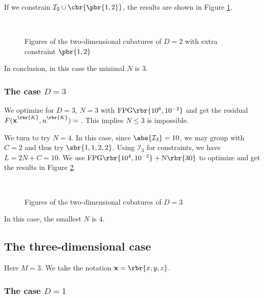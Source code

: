 \documentclass[english, nochinese]{pnote}
\begin{document}
If we constrain $ \mathcal{I}_2 \cup \cbr{ \pbr{ 1, 2 } } $, the results are shown in Figure \ref{Fig:M2D212}.

\begin{figure}[htbp]
\centering
\scalebox{0.75}{}~
\scalebox{0.75}{}
\caption{Figures of the two-dimensional cubatures of $ D = 2 $ with extra constraint $ \pbr{ 1, 2 } $}
\label{Fig:M2D212}
\end{figure}

In conclusion, in this case the minimal $N$ is $3$.

\subsubsection{The case $ D = 3 $}

We optimize for $ D = 3 $, $ N = 3 $ with $ \text{FPG} \rbr{ 10^6, 10^{-2} } $ and get the residual $ F ( \mathbf{x}_{\cdot}^{\rbr{K}}, u_{\cdot}^{\rbr{K}} ) = \text{} $. This implies $ N \le 3 $ is impossible.

We turn to try $ N = 4 $. In this case, since $ \abs{\mathcal{I}_3} = 10 $, we may group with $ C = 2 $ and thus try $ \sbr{ 1, 1, 2, 2 } $. Using $\mathcal{I}_3$ for constraints, we have $ L = 2 N + C = 10 $. We use $ \text{FPG} \rbr{ 10^4, 10^{-2} } + \text{N} \rbr{30} $ to optimize and get the results in Figure \ref{Fig:M2D3}.

\begin{figure}[htbp]
\centering
\scalebox{0.75}{}~
\scalebox{0.75}{}
\caption{Figures of the two-dimensional cubatures of $ D = 3 $}
\label{Fig:M2D3}
\end{figure}

In this case, the smallest $N$ is $4$.

\subsection{The three-dimensional case}

Here $ M = 3 $. We take the notation $ \mathbf{x} = \rbr{ x, y, z } $.

\subsubsection{The case $ D = 1 $}
\end{document}

